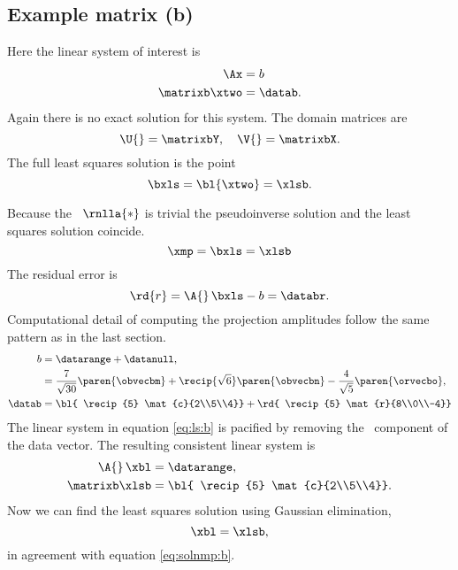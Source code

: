 \subsection{Example matrix (b)}
Here the linear system of interest is
%
\begin{equation}
  \begin{split}
    \Ax &= b \\
    \matrixb \xtwo &= \datab.
  \end{split}
  \label{eq:ls:b}
\end{equation}
%
Again there is no exact solution for this system.
%
The domain matrices are
\begin{equation}
  \U{} = \matrixbY, \quad \V{} = \matrixbX .
\end{equation}
%
The full least squares solution is the point
%
\begin{equation}
  \bxls = {\bl{ \xtwo }} = \xlsb.
\end{equation}
%

Because the \ns\ $\rnlla{*}$ is trivial the pseudoinverse solution and the least squares solution coincide.
%
\begin{equation}
  \xmp = \bxls = \xlsb
  \label{eq:solnmp:b}
\end{equation}
%
The residual error is
%
\begin{equation}
  {\rd{ r }} = \A{}\,\bxls - b = \databr.
\end{equation}
%
Computational detail of computing the projection amplitudes follow the same pattern as in the last section.
%
\begin{equation}
  \begin{split}
     b &= \datarange + \datanull, \\
       &= \frac{7}{\sqrt{30}} \paren{\obvecbm}  + \recip{\sqrt{6}} \paren{\obvecbn}  - \frac{4}{\sqrt{5}} \paren{\orvecbo} , \\
     \datab &= {\bl{ \recip{5} \mat{c}{2\\5\\4}}} + {\rd{ \recip{5} \mat{r}{8\\0\\-4}}}
  \end{split}
  \label{eq:regularize:b}
\end{equation}
%
The linear system in equation \eqref{eq:ls:b} is pacified by removing the \ns\ component of the data vector. The resulting consistent linear system is
\begin{equation}
  \begin{split}
    \A{}\, \xbl &= \datarange, \\
    \matrixb \xlsb &= {\bl{ \recip{5} \mat{c}{2\\5\\4}}} .
  \end{split}
\end{equation}
Now we can find the least squares solution using Gaussian elimination,
%
\begin{equation}
  \xbl = \xlsb,
\end{equation}
in agreement with equation \eqref{eq:solnmp:b}.

